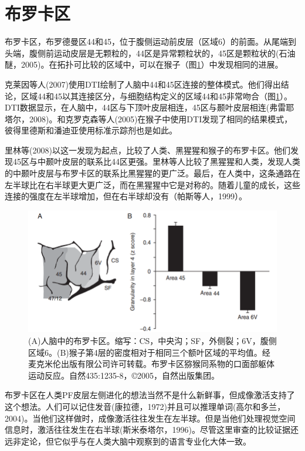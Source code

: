 \section{布罗卡区}
布罗卡区，布罗德曼区44和45，位于腹侧运动前皮层（区域6）的前面。从尾端到头端，腹侧前运动皮层是无颗粒的，44区是异常颗粒状的，45区是颗粒状的(石油醚，2005)。在拓扑可比较的区域中，可以在猴子（图\ref{fig:fig_9_3}）中发现相同的进展。
\par
克莱因等人(2007)使用DTI绘制了人脑中44和45区连接的整体模式。他们得出结论，区域44和45以其连接区分，与细胞结构定义的区域44和45非常吻合（图\ref{fig:fig_9_3}）。DTI数据显示，在人脑中，44区与下顶叶皮层相连，45区与颞叶皮层相连(弗雷耶塔尔，2008)。和克罗克森等人(2005)在猴子中使用DTI发现了相同的结果模式，彼得里德斯和潘迪亚使用标准示踪剂也是如此。
\par
里林等(2008)以这一发现为起点，比较了人类、黑猩猩和猴子的布罗卡区。他们发现45区与中颞叶皮层的联系比44区更强。里林等人比较了黑猩猩和人类，发现人类的中颞叶皮层与布罗卡区的联系比黑猩猩的更广泛。最后，在人类中，这条通路在左半球比在右半球更大更广泛，而在黑猩猩中它是对称的。随着儿童的成长，这些连接的强度在左半球增加，但在右半球却没有（帕斯等人，1999）。
\par
\begin{figure}[!htb]
	\centering
	\includegraphics[width=0.5\linewidth]{image_pfc/Fig_9_3}
	\caption{(A)人脑中的布罗卡区。缩写：CS，中央沟；SF，外侧裂；6V，腹侧区域6。(B)猴子第4层的密度相对于相同三个额叶区域的平均值。经麦克米伦出版有限公司许可转载。布罗卡区猕猴同系物的口面部躯体运动反应。自然435:1235-8，©2005，自然出版集团。\label{fig:fig_9_3}}
\end{figure}

\par
布罗卡区在人类PF皮层左侧进化的想法当然不是什么新鲜事，但成像激活支持了这个想法。人们可以记住发音(康拉德，1972)并且可以推理单词(高尔和多兰，2004)。当他们这样做时，成像激活往往发生在左半球。但是当他们处理视觉空间信息时，激活往往发生在右半球(斯米泰塔尔，1996)。尽管这里审查的比较证据还远非定论，但它似乎与在人类大脑中观察到的语言专业化大体一致。
